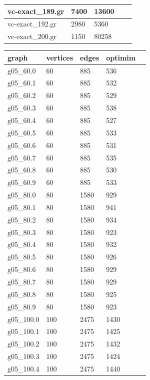 \documentclass[twocolumn]{article}
\begin{document}
\begin{table}[!ht]
\begin{tabular}{|l|l|l|l|l|}
        vc-exact\_189.gr & 7400 & 13600 \\ \hline
        vc-exact\_192.gr & 2980 & 5360 \\ \hline
        vc-exact\_200.gr & 1150 & 80258 \\ \hline
    \end{tabular}
    \begin{tabular}{|l|l|l|l|l|}
    \hline
        graph & vertices & edges & optimim \\ \hline
        g05\_60.0 & 60 & 885 & 536 \\ \hline
        g05\_60.1 & 60 & 885 & 532 \\ \hline
        g05\_60.2 & 60 & 885 & 529 \\ \hline
        g05\_60.3 & 60 & 885 & 538 \\ \hline
        g05\_60.4 & 60 & 885 & 527 \\ \hline
        g05\_60.5 & 60 & 885 & 533 \\ \hline
        g05\_60.6 & 60 & 885 & 531 \\ \hline
        g05\_60.7 & 60 & 885 & 535 \\ \hline
        g05\_60.8 & 60 & 885 & 530 \\ \hline
        g05\_60.9 & 60 & 885 & 533 \\ \hline
        g05\_80.0 & 80 & 1580 & 929 \\ \hline
        g05\_80.1 & 80 & 1580 & 941 \\ \hline
        g05\_80.2 & 80 & 1580 & 934 \\ \hline
        g05\_80.3 & 80 & 1580 & 923 \\ \hline
        g05\_80.4 & 80 & 1580 & 932 \\ \hline
        g05\_80.5 & 80 & 1580 & 926 \\ \hline
        g05\_80.6 & 80 & 1580 & 929 \\ \hline
        g05\_80.7 & 80 & 1580 & 929 \\ \hline
        g05\_80.8 & 80 & 1580 & 925 \\ \hline
        g05\_80.9 & 80 & 1580 & 923 \\ \hline
        g05\_100.0 & 100 & 2475 & 1430 \\ \hline
        g05\_100.1 & 100 & 2475 & 1425 \\ \hline
        g05\_100.2 & 100 & 2475 & 1432 \\ \hline
        g05\_100.3 & 100 & 2475 & 1424 \\ \hline
        g05\_100.4 & 100 & 2475 & 1440 \\ \hline

\end{tabular}
\end{table}
\end{document}
